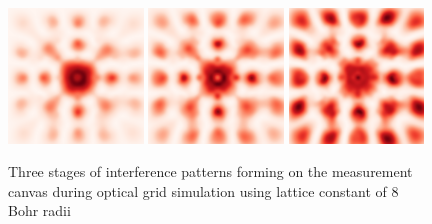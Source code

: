 \begin{figure}
	\begin{center}
		\includegraphics[width=0.32\textwidth]{figures/optical_grid_interference_01_8_grid.png}
		\includegraphics[width=0.32\textwidth]{figures/optical_grid_interference_02_8_grid.png}
		\includegraphics[width=0.32\textwidth]{figures/optical_grid_interference_03_8_grid.png}
		\caption{Three stages of interference patterns forming on the measurement canvas during optical grid simulation using lattice constant of $8$ Bohr radii}
		\label{fig:optical_grid_interference_8_grid}
	\end{center}	
\end{figure}

